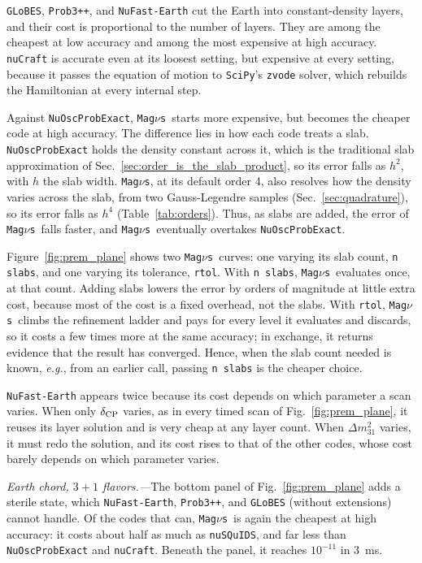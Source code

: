 \documentclass[final,5p,times,twocolumn,sort,compress]{elsarticle}
\makeatletter
\newcommand{\eg}{{\it e.g.}}
\newcommand{\fig}{Fig.}
\DeclareRobustCommand{\_}{%
  \ifmmode\nfss@text{\textunderscore}\else\textunderscore\allowbreak\fi}
\newcommand{\figu}[1]{\fig~\ref{fig:#1}}
\newcommand{\magnus}{{\tt Mag}\ensuremath{\nu}{\tt s}}
\makeatother
\begin{document}
{\tt GLoBES}, {\tt Prob3++}, and {\tt NuFast-Earth} cut the Earth into constant-density layers, and their cost is proportional to the number of layers. They are among the cheapest at low accuracy and among the most expensive at high accuracy. {\tt nuCraft} is accurate even at its loosest setting, but expensive at every setting, because it passes the equation of motion to {\tt SciPy}'s {\tt zvode} solver, which rebuilds the Hamiltonian at every internal step.

Against {\tt NuOscProbExact}, \magnus\ starts more expensive, but becomes the cheaper code at high accuracy. The difference lies in how each code treats a slab. {\tt NuOscProbExact} holds the density constant across it, which is the traditional slab approximation of Sec.~\ref{sec:order_is_the_slab_product}, so its error falls as $h^2$, with $h$ the slab width. \magnus, at its default order 4, also resolves how the density varies across the slab, from two Gauss-Legendre samples (Sec.~\ref{sec:quadrature}), so its error falls as $h^4$ (Table~\ref{tab:orders}). Thus, as slabs are added, the error of \magnus\ falls faster, and \magnus\ eventually overtakes {\tt NuOscProbExact}.

Figure~\ref{fig:prem_plane} shows two \magnus\ curves: one varying its slab count, {\tt n\_slabs}, and one varying its tolerance, {\tt rtol}. With {\tt n\_slabs}, \magnus\ evaluates once, at that count. Adding slabs lowers the error by orders of magnitude at little extra cost, because most of the cost is a fixed overhead, not the slabs. With {\tt rtol}, \magnus\ climbs the refinement ladder and pays for every level it evaluates and discards, so it costs a few times more at the same accuracy; in exchange, it returns evidence that the result has converged. Hence, when the slab count needed is known, \eg, from an earlier call, passing {\tt n\_slabs} is the cheaper choice.

{\tt NuFast-Earth} appears twice because its cost depends on which parameter a scan varies. When only $\delta_{\rm CP}$ varies, as in every timed scan of \figu{prem_plane}, it reuses its layer solution and is very cheap at any layer count. When $\Delta m^2_{31}$ varies, it must redo the solution, and its cost rises to that of the other codes, whose cost barely depends on which parameter varies.

\smallskip

\textit{Earth chord, $3+1$ flavors.---}The bottom panel of \figu{prem_plane} adds a sterile state, which {\tt NuFast-Earth}, {\tt Prob3++}, and {\tt GLoBES} (without extensions) cannot handle. Of the codes that can, \magnus\ is again the cheapest at high accuracy: it costs about half as much as {\tt nuSQuIDS}, and far less than {\tt NuOscProbExact} and {\tt nuCraft}. Beneath the panel, it reaches $10^{-11}$ in 3~ms.
\end{document}
